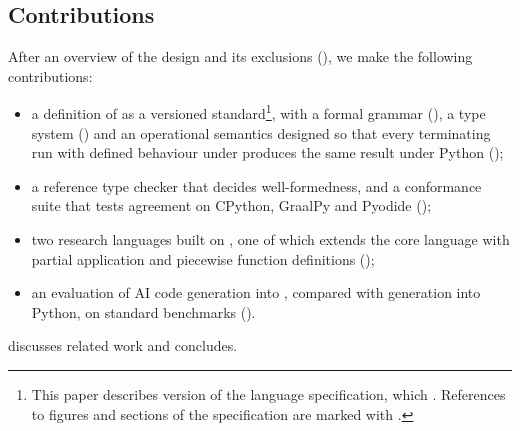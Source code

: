 \subsection{Contributions}

After an overview of the design and its exclusions (), we make the following contributions:
\begin{itemize}
\item a definition of \PurePy as a versioned standard\footnote{This paper describes version
\versionstring{} of the \PurePy language specification, which \specificationavailability. References to figures and
sections of the specification are marked with \specdoclink{\specmark}.}, with a formal
grammar (), a type system () and an operational semantics designed so
that every terminating run with defined behaviour under \PurePy{} produces the same result under Python
();
\item a reference type checker that decides well-formedness, and a conformance suite that tests agreement on
CPython, GraalPy and Pyodide ();
\item two research languages built on \PurePy, one of which extends the core language with partial application
and piecewise function definitions ();
\item an evaluation of AI code generation into \PurePy, compared with generation into Python, on standard benchmarks ().
\end{itemize}
 discusses related work and  concludes.
